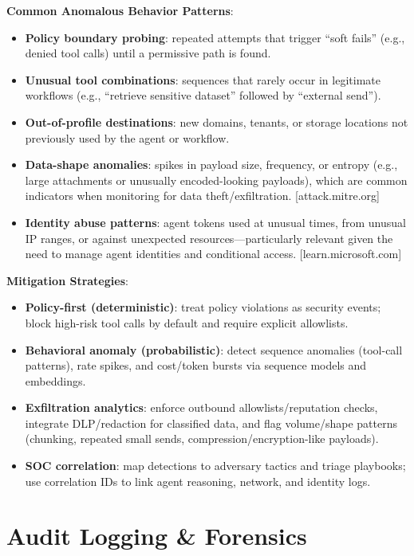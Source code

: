 \begin{TNtwocol}
    \textbf{Common Anomalous Behavior Patterns}:
    \begin{itemize}
        \item \textbf{Policy boundary probing}: repeated attempts that trigger “soft fails” (e.g., denied tool calls) until a permissive path is found.
        \item \textbf{Unusual tool combinations}: sequences that rarely occur in legitimate workflows (e.g., “retrieve sensitive dataset” followed by “external send”).
        \item \textbf{Out-of-profile destinations}: new domains, tenants, or storage locations not previously used by the agent or workflow.
        \item \textbf{Data-shape anomalies}: spikes in payload size, frequency, or entropy (e.g., large attachments or unusually encoded-looking payloads), which are common indicators when monitoring for data theft/exfiltration. [attack.mitre.org]
        \item \textbf{Identity abuse patterns}: agent tokens used at unusual times, from unusual IP ranges, or against unexpected resources—particularly relevant given the need to manage agent identities and conditional access. [learn.microsoft.com]
    \end{itemize}

    \textbf{Mitigation Strategies}:
    \begin{itemize}
        \item \textbf{Policy-first (deterministic)}: treat policy violations as security events; block high-risk tool calls by default and require explicit allowlists.
        \item \textbf{Behavioral anomaly (probabilistic)}: detect sequence anomalies (tool-call patterns), rate spikes, and cost/token bursts via sequence models and embeddings.
        \item \textbf{Exfiltration analytics}: enforce outbound allowlists/reputation checks, integrate DLP/redaction for classified data, and flag volume/shape patterns (chunking, repeated small sends, compression/encryption-like payloads).
        \item \textbf{SOC correlation}: map detections to adversary tactics and triage playbooks; use correlation IDs to link agent reasoning, network, and identity logs.
    \end{itemize}

    \section{Audit Logging & Forensics}


\end{TNtwocol}
